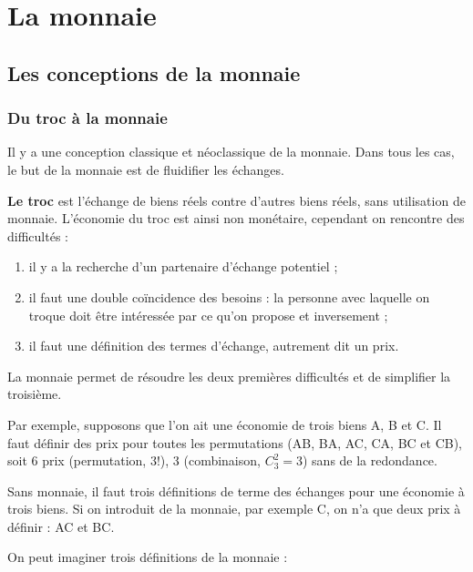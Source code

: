 \chapter{La monnaie}

\section{Les conceptions de la monnaie}

	\subsection{Du troc à la monnaie}
	
	Il y a une conception classique et néoclassique de la monnaie. Dans tous les cas, le but de la monnaie est de fluidifier les échanges.
	
	\textbf{Le troc} est l'échange de biens réels contre d'autres biens réels, sans utilisation de monnaie. L'économie du troc est ainsi non monétaire, cependant on rencontre des difficultés :
	
	\begin{enumerate}
		\item il y a la recherche d'un partenaire d'échange potentiel ;
		\item il faut une double coïncidence des besoins : la personne avec laquelle on troque doit être intéressée par ce qu'on propose et inversement ;
		\item il faut une définition des termes d'échange, autrement dit un prix.
	\end{enumerate}
	
	La monnaie permet de résoudre les deux premières difficultés et de simplifier la troisième.
	
	Par exemple, supposons que l'on ait une économie de trois biens A, B et C. Il faut définir des prix pour toutes les permutations (AB, BA, AC, CA, BC et CB), soit 6 prix (permutation, $3!$), 3 (combinaison, $C_3^2 = 3$) sans de la redondance.
	
	Sans monnaie, il faut trois définitions de terme des échanges pour une économie à trois biens. Si on introduit de la monnaie, par exemple C, on n'a que deux prix à définir : AC et BC.
	
	On peut imaginer trois définitions de la monnaie :
	
